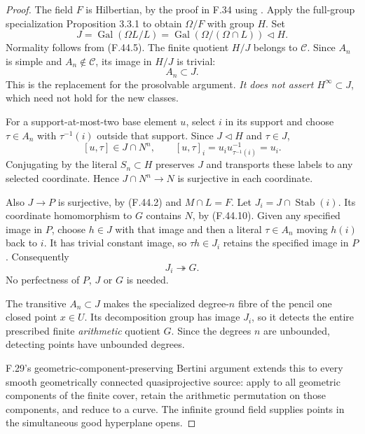 \begin{proof}
The field \(F\) is Hilbertian, by the proof in F.34 using \citet[Corollary~3.2.2 and Theorem~3.4.1]{F_Serre2007}. Apply the full-group specialization Proposition 3.3.1 to obtain \(\Omega/F\) with group \(H\). Set
\[
 J=\operatorname{Gal}(\Omega L/L)
   =\operatorname{Gal}(\Omega/(\Omega\cap L))\triangleleft H .
\]
Normality follows from \textup{(F.44.5)}. The finite quotient \(H/J\) belongs to \(\mathcal C\). Since \(A_n\) is simple and \(A_n\notin\mathcal C\), its image in \(H/J\) is trivial:
\[
                         A_n\subset J.
 \tag{F.44.9}
\]
This is the replacement for the prosolvable argument. \emph{It does not assert \(H^\infty\subset J\)}, which need not hold for the new classes.

For a support-at-most-two base element \(u\), select \(i\) in its support and choose \(\tau\in A_n\) with \(\tau^{-1}(i)\) outside that support. Since \(J\triangleleft H\) and \(\tau\in J\),
\[
 [u,\tau]\in J\cap N^n,\qquad
 [u,\tau]_i=u_i u_{\tau^{-1}(i)}^{-1}=u_i.
 \tag{F.44.10}
\]
Conjugating by the literal \(S_n\subset H\) preserves \(J\) and transports these labels to any selected coordinate. Hence \(J\cap N^n\to N\) is surjective in each coordinate.

Also \(J\to P\) is surjective, by \textup{(F.44.2)} and \(M\cap L=F\). Let \(J_i=J\cap\operatorname{Stab}(i)\). Its coordinate homomorphism to \(G\) contains \(N\), by \textup{(F.44.10)}. Given any specified image in \(P\), choose \(h\in J\) with that image and then a literal \(\tau\in A_n\) moving \(h(i)\) back to \(i\). It has trivial constant image, so \(\tau h\in J_i\) retains the specified image in \(P\). Consequently
\[
                             J_i\twoheadrightarrow G.
 \tag{F.44.11}
\]
No perfectness of \(P\), \(J\) or \(G\) is needed.

The transitive \(A_n\subset J\) makes the specialized degree-\(n\) fibre of the pencil one closed point \(x\in U\). Its decomposition group has image \(J_i\), so it detects the entire prescribed finite \emph{arithmetic} quotient \(G\). Since the degrees \(n\) are unbounded, detecting points have unbounded degrees.

F.29's geometric-component-preserving Bertini argument extends this to every smooth geometrically connected quasiprojective source: apply \citet[Theorem~1.5]{F_PoonenSlavov2020} to all geometric components of the finite cover, retain the arithmetic permutation on those components, and reduce to a curve. The infinite ground field supplies points in the simultaneous good hyperplane opens.


\end{proof}
